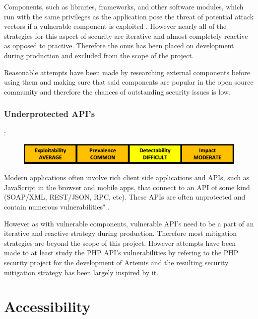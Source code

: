     Components, such as libraries, frameworks, and other software modules, which run with the same privileges as the application pose the threat of potential attack vectors if a vulnerable component is exploited  \cite{OWASP2017}. However nearly all of the strategies for this aspect of security are iterative and almost completely reactive as opposed to practive. Therefore the onus has been placed on development during production and excluded from the scope of the project.
    
    Reasonable attempts have been made by researching external components before using them and making sure that said components are popular in the open source community and therefore the chances of outstanding security issues is low.
    
    \subsubsection{Underprotected API's}:
    
    \begin{figure}[h]
    	\centering
    	\includegraphics[scale=0.5,center]{chapters/chapter03/figures/api.png}
    	\label{Underprotected API}
    \end{figure}

        
    Modern applications often involve rich client side applications and APIs, such as JavaScript in the browser and mobile apps, that connect to an API of some kind (SOAP/XML, REST/JSON, RPC, etc)\cite{OWASP2017}. These APIs are often unprotected and contain numerous vulnerabilities" \cite{OWASP2017}.
    
    However as with vulnerable components, vulnerable API's need to be a part of an iterative and reactive strategy during production. Therefore most mitigation strategies are beyond the scope of this project. However attempts have been made to at least study the PHP API's vulnerabilities by refering to the PHP security project  for the development of Artemis and the resulting security mitigation strategy has been largely inspired by it.
    



\newpage
\section{Accessibility}
\label{sec:accessibility}

